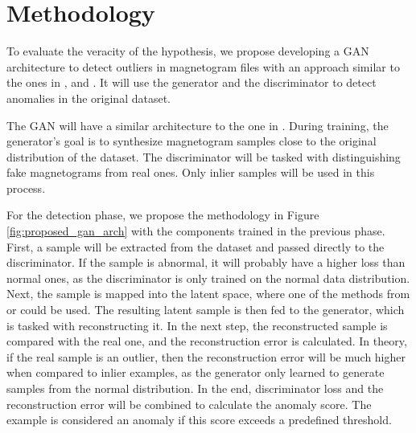 \section{Methodology}\label{sec:method}
To evaluate the veracity of the hypothesis, we propose developing a GAN architecture to detect outliers in magnetogram files with an approach similar to the ones in \cite{li.etal_MADGANMultivariateAnomaly_2019}, and \cite{bashar.nayak_TAnoGANTimeSeries_2020}. It will use the generator and the discriminator to detect anomalies in the original dataset. 

The GAN will have a similar architecture to the one in \cite{goodfellow.etal_GenerativeAdversarialNets_}. During training, the generator's goal is to synthesize magnetogram samples close to the original distribution of the dataset. The discriminator will be tasked with distinguishing fake magnetograms from real ones. Only inlier samples will be used in this process.

For the detection phase, we propose the methodology in Figure \ref{fig:proposed_gan_arch} with the components trained in the previous phase. First, a sample will be extracted from the dataset and passed directly to the discriminator. If the sample is abnormal, it will probably have a higher loss than normal ones, as the discriminator is only trained on the normal data distribution. Next, the sample is mapped into the latent space, where one of the methods from \cite{li.etal_MADGANMultivariateAnomaly_2019} or \cite{bashar.nayak_TAnoGANTimeSeries_2020} could be used. The resulting latent sample is then fed to the generator, which is tasked with reconstructing it. In the next step, the reconstructed sample is compared with the real one, and the reconstruction error is calculated. In theory, if the real sample is an outlier, then the reconstruction error will be much higher when compared to inlier examples, as the generator only learned to generate samples from the normal distribution. In the end, discriminator loss and the reconstruction error will be combined to calculate the anomaly score. The example is considered an anomaly if this score exceeds a predefined threshold.

